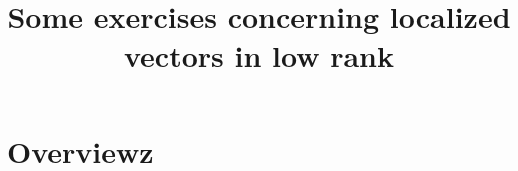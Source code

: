 \documentclass[reqno]{amsart} 
\title{Some exercises concerning localized vectors in low rank}
\numberwithin{equation}{section}
\numberwithin{theorem}{section}
\begin{document}
\section{Overviewz}\label{sec:d1a9162ede03}






{} 
\end{document}
